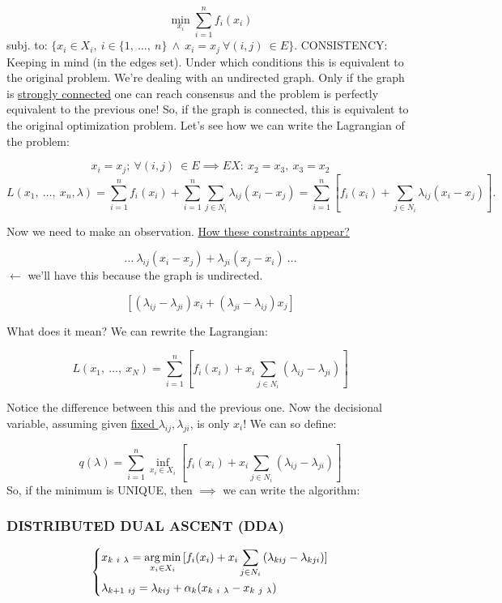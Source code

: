 \[
	\min_{x_i}{\sum_{i=1}^n{f_i(x_i)}}
\]
subj. to: $\{x_i\in X_i,\ i\in\{1,\ \dots,\ n\}\ \land\ x_i=x_j\ \forall(i,j)\ \in E\}$. CONSISTENCY: Keeping in mind (in the edges set). Under which conditions this is equivalent to the original problem. We're dealing with an undirected graph. Only if the graph is \underline{strongly connected} one can reach consensus and the problem is perfectly equivalent to the previous one!
So, if the graph is connected, this is equivalent to the original optimization problem. Let's see how we can write the Lagrangian of the problem:

\[
	x_i=x_j;\ \forall(i,j)\ \in E \implies EX:\ x_2=x_3,\ x_3=x_2
\]
\[
	L(x_1,\ \dots,\ x_n,\lambda) = \sum_{i=1}^n{f_i(x_i)} + \sum_{i=1}^n{\sum_{j\in N_i}{\lambda_{ij}(x_i-x_j)}} = \sum_{i=1}^n{[f_i(x_i) + \sum_{j\in N_i}{\lambda_{ij}(x_i-x_j)}]}.
\]

Now we need to make an observation. \underline{How these constraints appear?}

\[
	\dots\ \lambda_{ij}(x_i-x_j) + \lambda_{ji}(x_j-x_i)\ \dots
\]
$\leftarrow$ we'll have this because the graph is undirected.

\[
	[(\lambda_{ij}-\lambda_{ji})x_i + (\lambda_{ji}-\lambda_{ij})x_j]
\]

What does it mean? We can rewrite the Lagrangian:

\[
	L(x_1,\ \dots,\ x_N) = \sum_{i=1}^n{[f_i(x_i) + x_i\sum_{j\in N_i}{(\lambda_{ij}-\lambda_{ji})}]}
\]

Notice the difference between this and the previous one. Now the decisional variable, assuming given \underline{fixed $\lambda_{ij},\lambda_{ji}$}, is only $x_i$! We can so define:

\[
	q(\lambda) = \sum_{i=1}^n{\inf_{x_i\in X_i}{[f_i(x_i) + x_i\sum_{j\in N_i}{(\lambda_{ij}-\lambda_{ji})}]}}
\]
So, if the minimum is UNIQUE, then $\implies$ we can write the algorithm:

\subsubsection{DISTRIBUTED DUAL ASCENT (DDA)}

\[
	\left\{
	\begin{aligned}
	&x_{k\ i\ \lambda} = \argmin_{x_i\in X_i}{[f_i(x_i) + x_i\sum_{j\in N_i}{(\lambda_{kij}-\lambda_{kji})}]}\\
	&\lambda_{k+1\ ij} = \lambda_{kij} +\alpha_k(x_{k\ i\ \lambda}-x_{k\ j\ \lambda})
	\end{aligned}
	\right.
\]

